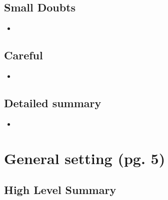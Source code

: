 \documentclass{article}
\begin{document}
\subsection*{Small Doubts}

    \begin{itemize}

    \item 
    
    \end{itemize}

\subsection*{Careful}

    \begin{itemize}

    \item 
    
    \end{itemize}


\subsection*{Detailed summary}

    \begin{itemize}

    \item 
    
    \end{itemize}

\section{General setting (pg. 5)}

\subsection*{High Level Summary}
\end{document}
